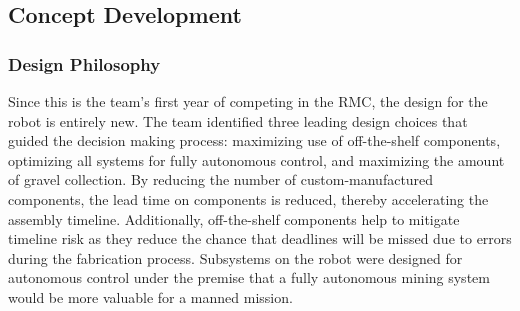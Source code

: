 \documentclass[class=article, crop=false]{standalone}
\begin{document}
	\subsection{Concept Development}
	\label{subsec:concept_development}
	\subsubsection{Design Philosophy}
	Since this is the team’s first year of competing in the RMC, the design for the robot is entirely new. The team identified three leading design choices that guided the decision making process: maximizing use of off-the-shelf components, optimizing all systems for fully autonomous control, and maximizing the amount of gravel collection. By reducing the number of custom-manufactured components, the lead time on components is reduced, thereby accelerating the assembly timeline. Additionally, off-the-shelf components help to mitigate timeline risk as they reduce the chance that deadlines will be missed due to errors during the fabrication process. Subsystems on the robot were designed for autonomous control under the premise that a fully autonomous mining system would be more valuable for a manned mission. 

	
\end{document}
